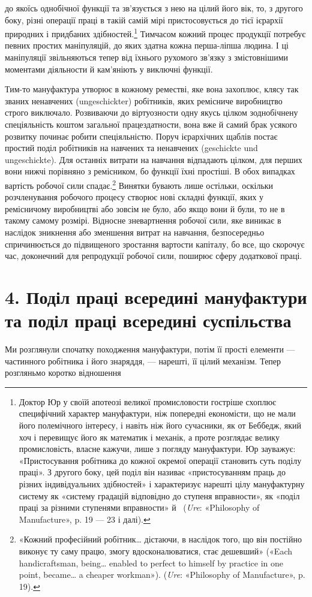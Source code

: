 \parcont{}  %
до якоїсь однобічної функції та зв’язується з нею на цілий його
вік, то, з другого боку, різні операції праці в такій самій мірі
пристосовується до тієї ієрархії природних і придбаних здібностей.\footnote{
Доктор Юр у своїй апотеозі великої промисловости гостріше
схоплює специфічний характер мануфактури, ніж попередні економісти,
що не мали його полемічного інтересу, і навіть ніж його сучасники,
як от Беббедж, який хоч і перевищує його як математик і механік, а проте
розглядає велику промисловість, власне кажучи, лише з погляду мануфактури.
Юр зауважує: «Пристосування робітника до кожної окремої
операції становить суть поділу праці». З другого боку, цей поділ він називає
«пристосуванням праць до різних індивідуальних здібностей» і характеризує
нарешті цілу мануфактурну систему як «систему градацій
відповідно до ступеня вправности», як «поділ праці за різними ступенями
вправности» й~ (\emph{Ure}: «Philosophy of Manufacture», p. 19 —
23 і далі).
} Тимчасом кожний процес продукції потребує певних
простих маніпуляцій, до яких здатна кожна перша-ліпша людина.
І ці маніпуляції звільняються тепер від їхнього рухомого
зв’язку з змістовнішими моментами діяльности й кам’яніють у
виключні функції.

Тим-то мануфактура утворює в кожному реместві, яке вона
захоплює, клясу так званих ненавчених (ungeschickter) робітників,
яких ремісниче виробництво строго виключало. Розвиваючи
до віртуозности одну якусь цілком зоднобічнену спеціяльність
коштом загальної працездатности, вона вже й самий брак усякого
розвитку починає робити спеціяльністю. Поруч ієрархічних
щаблів постає простий поділ робітників на навчених та ненавчених
(geschickte und ungeschickte). Для останніх витрати
на навчання відпадають цілком, для перших вони нижчі порівняно
з ремісником, бо функції їхні простіші. В обох випадках вартість
робочої сили спадає.\footnote{
«Кожний професійний робітник\dots{} дістаючи, в наслідок того,
що він постійно виконує ту саму працю, змогу вдосконалюватися, стає
дешевший» («Each handicraftsman, being\dots{} enabled to perfect to himself
by practice in one point, became\dots{} a cheaper workman»). (\emph{Ure}:
«Philosophy of Manufacture», p. 19).
} Винятки бувають лише остільки, оскільки
розчленування робочого процесу створює нові складні функції,
яких у ремісничому виробництві або зовсім не було, або якщо вони
й були, то не в такому самому розмірі. Відносне зневартнення
робочої сили, яке виникає в наслідок зникнення або зменшення
витрат на навчання, безпосередньо спричинюється до підвищеного
зростання вартости капіталу, бо все, що скорочує час, доконечний
для репродукції робочої сили, поширює сферу додаткової
праці.

\section*{4. Поділ праці всередині мануфактури та поділ праці
всередині суспільства}

Ми розглянули спочатку походження мануфактури, потім
її прості елементи — частинного робітника і його знаряддя, —
нарешті, її цілий механізм. Тепер розгляньмо коротко відношення
\parbreak{}  %
